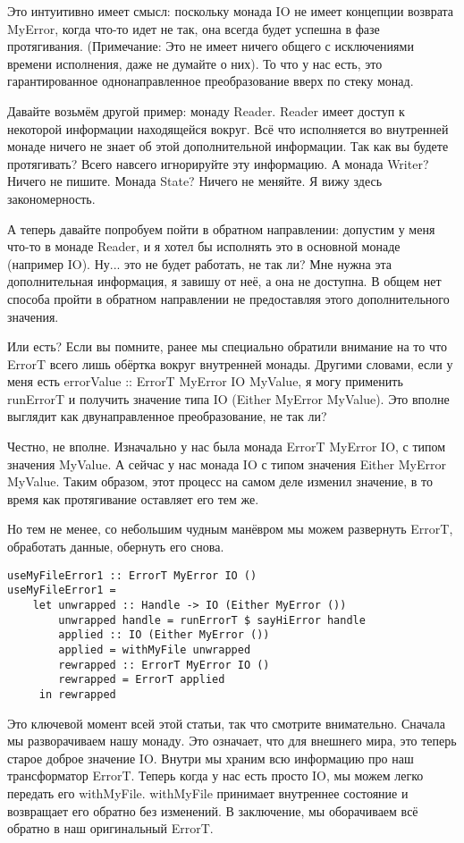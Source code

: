 Это интуитивно имеет смысл: поскольку монада IO не имеет концепции возврата MyError, когда что-то идет не так, она всегда будет успешна в фазе протягивания. (Примечание: Это не имеет ничего общего с исключениями времени исполнения, даже не думайте о них). То что у нас есть, это гарантированное однонаправленное преобразование вверх по стеку монад.

Давайте возьмём другой пример: монаду Reader. Reader имеет доступ к некоторой информации находящейся вокруг. Всё что исполняется во внутренней монаде ничего не знает об этой дополнительной информации. Так как вы будете протягивать? Всего навсего игнорируйте эту информацию. А монада Writer? Ничего не пишите. Монада State? Ничего не меняйте. Я вижу здесь  закономерность. 

А теперь давайте попробуем пойти в обратном направлении: допустим у меня что-то в монаде Reader, и я хотел бы исполнять это в основной монаде (например IO). Ну... это не будет работать, не так ли? Мне нужна эта дополнительная информация, я завишу от неё, а она не доступна. В общем нет способа пройти в обратном направлении не предоставляя этого дополнительного значения.

Или есть? Если вы помните, ранее мы специально обратили внимание на то что ErrorT всего лишь обёртка вокруг внутренней монады. Другими словами, если у меня есть errorValue :: ErrorT MyError IO MyValue, я могу применить runErrorT и получить значение типа IO (Either MyError MyValue). Это вполне выглядит как двунаправленное преобразование, не так ли?

Честно, не вполне. Изначально у нас была монада ErrorT MyError IO, с типом значения MyValue. А сейчас у нас монада IO с типом значения Either MyError MyValue. Таким образом, этот процесс на самом деле изменил значение, в то время как протягивание оставляет его тем же.

Но тем не менее, со небольшим чудным манёвром мы можем развернуть ErrorT, обработать данные,  обернуть его снова.

\begin{lstlisting}
useMyFileError1 :: ErrorT MyError IO ()
useMyFileError1 =
    let unwrapped :: Handle -> IO (Either MyError ())
        unwrapped handle = runErrorT $ sayHiError handle
        applied :: IO (Either MyError ())
        applied = withMyFile unwrapped
        rewrapped :: ErrorT MyError IO ()
        rewrapped = ErrorT applied
     in rewrapped
\end{lstlisting}

Это ключевой момент всей этой статьи, так что смотрите внимательно. Сначала мы разворачиваем нашу монаду. Это означает, что для внешнего мира, это теперь старое доброе значение IO. Внутри мы храним всю информацию про наш трансформатор ErrorT. Теперь когда у нас есть просто IO, мы можем легко передать его withMyFile. withMyFile принимает внутреннее состояние и возвращает его обратно без изменений. В заключение, мы оборачиваем всё обратно в наш оригинальный ErrorT.

